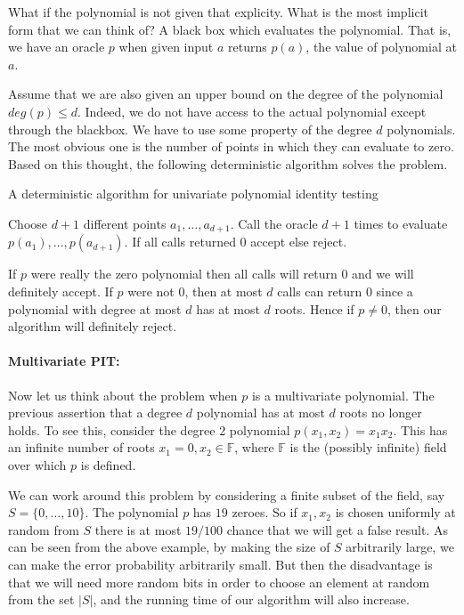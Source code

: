 What if the polynomial is not given that explicity. What is the most
implicit form that we can think of? A black box which evaluates the polynomial.
That is, we have an oracle $p$ when given input $a$ returns $p(a)$, the value of polynomial 
at $a$.


Assume that we are also given an upper bound on the degree of the
polynomial $deg(p) \leq d$.  Indeed, we do not have access to the
actual polynomial except through the blackbox. We have to use some
property of the degree $d$ polynomials. The most obvious one is the
number of points in which they can evaluate to zero. Based on this thought, 
the following deterministic algorithm solves the problem.


\begin{algorithm}%
\label{alg:univariate-pit}
\caption{A deterministic algorithm for univariate polynomial identity testing}
\begin{algorithmic}[1]
\State Choose $d + 1$ different points $a_1 , \ldots , a_{d+1}$.
\State Call the oracle $d+1$ times to evaluate $p(a_1), \ldots , p(a_{d+1})$.
\State If all calls returned 0 accept else reject.
\end{algorithmic}
\end{algorithm}

If $p$ were really the zero polynomial then all calls will return 0 and we will definitely accept. If $p$ were not 
0, then at most $d$ calls can return 0 since a polynomial with degree at most $d$ has at most $d$ 
roots. Hence if $p \neq 0$, then our algorithm will definitely reject.

\paragraph{Multivariate PIT:}
Now let us think about the problem when $p$ is a multivariate
polynomial. The previous assertion that a degree $d$ polynomial has at
most $d$ roots no longer holds. To see this, consider the degree 2
polynomial $p(x_1, x_2) = x_1 x_2$. This has an infinite number of
roots $x_1 = 0, x_2 \in \mathbb{F}$, where $\mathbb{F}$ is the
(possibly infinite) field over which $p$ is defined. 

We can work around this problem by considering a finite subset of the field, say
$S = \{ 0, \ldots ,10 \}$. The polynomial $p$ has $19$ zeroes. So if
$x_1, x_2$ is chosen uniformly at random from $S$ there is at most
$19/100$ chance that we will get a false result. As can be seen from
the above example, by making the size of $S$ arbitrarily large, we can
make the error probability arbitrarily small. But then the
disadvantage is that we will need more random bits in order to choose
an element at random from the set $|S|$, and the running time of our
algorithm will also increase.

